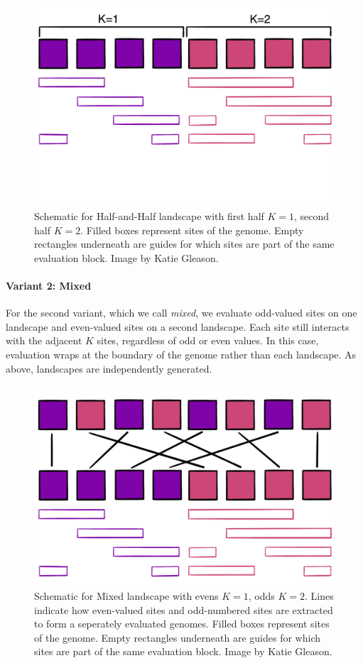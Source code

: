 \begin{figure}
    \centering
    \includegraphics{chapters/1-rank-epistasis/figs/HALF.PNG}
    \caption{Schematic for Half-and-Half landscape with first half $K=1$, second half $K=2$. Filled boxes represent sites of the genome. Empty rectangles underneath are guides for which sites are part of the same evaluation block. Image by Katie Gleason.}
    \label{fig:method:half}
\end{figure}


\paragraph{Variant 2: Mixed}
For the second variant, which we call \textit{mixed}, we evaluate odd-valued sites on one landscape and even-valued sites on a second landscape. Each site still interacts with the adjacent $K$ sites, regardless of odd or even values. In this case, evaluation wraps at the boundary of the genome rather than each landscape. As above, landscapes are independently generated.

\begin{figure}
    \centering
    \includegraphics{chapters/1-rank-epistasis/figs/MIXED.PNG}
    \caption{Schematic for Mixed landscape with evens $K=1$, odds $K=2$. Lines indicate how even-valued sites and odd-numbered sites are extracted to form a seperately evaluated genomes. Filled boxes represent sites of the genome. Empty rectangles underneath are guides for which sites are part of the same evaluation block. Image by Katie Gleason.}
    \label{fig:method:half}
\end{figure}


